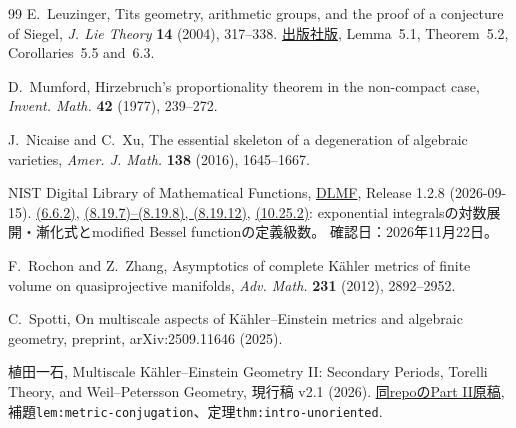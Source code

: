 \documentclass[11pt,a4paper]{ltjsarticle}
\theoremstyle{plain}
\theoremstyle{definition}
\theoremstyle{remark}
\begin{document}
\begin{thebibliography}{99}
E.~Leuzinger,
\newblock Tits geometry, arithmetic groups, and the proof of a conjecture of Siegel,
\newblock \emph{J. Lie Theory} \textbf{14} (2004), 317--338.
\newblock \href{https://www.heldermann-verlag.de/jlt/jlt14/leuzams.pdf}{出版社版},
Lemma~5.1, Theorem~5.2, Corollaries~5.5 and~6.3.

D.~Mumford,
\newblock Hirzebruch's proportionality theorem in the non-compact case,
\newblock \emph{Invent. Math.} \textbf{42} (1977), 239--272.

J.~Nicaise and C.~Xu,
\newblock The essential skeleton of a degeneration of algebraic varieties,
\newblock \emph{Amer. J. Math.} \textbf{138} (2016), 1645--1667.

NIST Digital Library of Mathematical Functions,
\newblock \href{https://dlmf.nist.gov/}{DLMF}, Release 1.2.8 (2026-09-15).
\newblock \href{https://dlmf.nist.gov/6.6.E2}{(6.6.2)},
\href{https://dlmf.nist.gov/8.19}{(8.19.7)--(8.19.8), (8.19.12)},
\href{https://dlmf.nist.gov/10.25.E2}{(10.25.2)}:
exponential integralsの対数展開・漸化式とmodified Bessel functionの定義級数。
確認日：2026年11月22日。

F.~Rochon and Z.~Zhang,
\newblock Asymptotics of complete K\"ahler metrics of finite volume on quasiprojective manifolds,
\newblock \emph{Adv. Math.} \textbf{231} (2012), 2892--2952.

C.~Spotti,
\newblock On multiscale aspects of K\"ahler--Einstein metrics and algebraic geometry,
\newblock preprint, arXiv:2509.11646 (2025).

植田一石,
\newblock Multiscale K\"ahler--Einstein Geometry II:
Secondary Periods, Torelli Theory, and Weil--Petersson Geometry,
\newblock 現行稿 v2.1 (2026).
\newblock \href{https://github.com/uedakazushi/multiscale-kaehler-einstein/blob/main/papers/secondary-periods-torelli.tex}{同repoのPart II原稿},
補題\texttt{lem:metric-conjugation}、定理\texttt{thm:intro-unoriented}.

\end{thebibliography}
\end{document}

